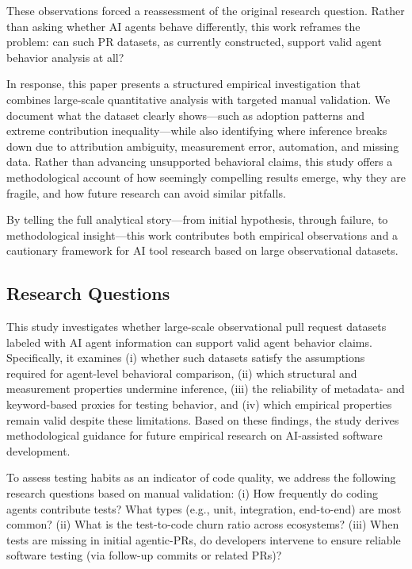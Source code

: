 \documentclass[conference]{IEEEtran}
\begin{document}
These observations forced a reassessment of the original research question. Rather than asking whether AI agents behave differently, this work reframes the problem: can such PR datasets, as currently constructed, support valid agent behavior analysis at all?

In response, this paper presents a structured empirical investigation that combines large-scale quantitative analysis with targeted manual validation. We document what the dataset clearly shows—such as adoption patterns and extreme contribution inequality—while also identifying where inference breaks down due to attribution ambiguity, measurement error, automation, and missing data. Rather than advancing unsupported behavioral claims, this study offers a methodological account of how seemingly compelling results emerge, why they are fragile, and how future research can avoid similar pitfalls.

By telling the full analytical story—from initial hypothesis, through failure, to methodological insight—this work contributes both empirical observations and a cautionary framework for AI tool research based on large observational datasets.

\subsection{Research Questions}
\label{sec:research_questions}
This study investigates whether large-scale observational pull request datasets labeled with AI agent information can support valid agent behavior claims. Specifically, it examines (i) whether such datasets satisfy the assumptions required for agent-level behavioral comparison, (ii) which structural and measurement properties undermine inference, (iii) the reliability of metadata- and keyword-based proxies for testing behavior, and (iv) which empirical properties remain valid despite these limitations. Based on these findings, the study derives methodological guidance for future empirical research on AI-assisted software development.

To assess testing habits as an indicator of code quality, we address the following research questions based on manual validation:
(i) How frequently do coding agents contribute tests? What types (e.g., unit, integration, end-to-end) are most common?
(ii) What is the test-to-code churn ratio across ecosystems?
(iii) When tests are missing in initial agentic-PRs, do developers intervene to ensure reliable software testing (via follow-up commits or related PRs)?
\end{document}
